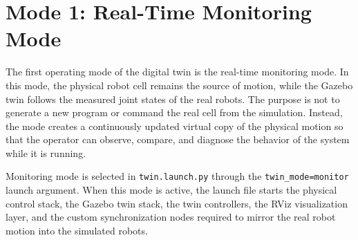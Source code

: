 \section{Mode 1: Real-Time Monitoring Mode}

The first operating mode of the digital twin is the real-time monitoring mode. In this mode, the physical robot cell remains the source of motion, while the Gazebo twin follows the measured joint states of the real robots. The purpose is not to generate a new program or command the real cell from the simulation. Instead, the mode creates a continuously updated virtual copy of the physical motion so that the operator can observe, compare, and diagnose the behavior of the system while it is running.

Monitoring mode is selected in \texttt{twin.launch.py} through the \texttt{twin\_mode=monitor} launch argument. When this mode is active, the launch file starts the physical control stack, the Gazebo twin stack, the twin controllers, the RViz visualization layer, and the custom synchronization nodes required to mirror the real robot motion into the simulated robots.

